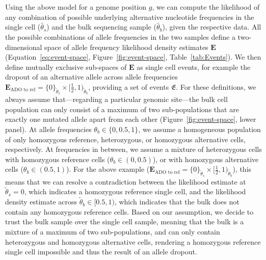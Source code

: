 \documentclass[authoryear,preprint,11pt]{scrartcl}
\begin{document}
Using the above model for a genome position $g$, we can compute the likelihood of any combination of possible underlying alternative nucleotide frequencies in the single cell ($\tilde{\theta_s}$) and the bulk sequencing sample ($\tilde{\theta_b}$), given the respective data.
All the possible combinations of allele frequencies in the two samples define a two-dimensional space of allele frequency likelihood density estimates $\boldsymbol{E}$ (Equation~\ref{eq:event-space}, Figure~\ref{fig:event-space}, Table~\ref{tab:Events}).
We then define mutually exclusive sub-spaces of $\boldsymbol{E}$ as single cell events, for example the dropout of an alternative allele across allele frequencies $\boldsymbol{E}_{\text{ADO to ref}} = \{ 0 \}_{\tilde{\theta}_s} \times [\frac{1}{2}, 1)_{\tilde{\theta}_b}$, providing a set of events $\mathfrak{E}$.
For these definitions, we always assume that---regarding a particular genomic site---the bulk cell population can only consist of a maximum of two sub-populations that are exactly one mutated allele apart from each other (Figure~\ref{fig:event-space}, lower panel).
At allele frequencies $\theta_b \in \{0, 0.5, 1\}$, we assume a homogeneous population of only homozygous reference, heterozygous, or homozygous alternative cells, respectively.
At frequencies in between, we assume a mixture of heterozygous cells with homozygous reference cells ($\theta_b \in (0,0.5)$), or with homozygous alternative cells ($\theta_b \in (0.5,1)$).
For the above example ($\boldsymbol{E}_{\text{ADO to ref}} = \{ 0 \}_{\tilde{\theta}_s} \times [\frac{1}{2}, 1)_{\tilde{\theta}_b}$), this means that we can resolve a contradiction between the likelihood estimate at $\tilde{\theta}_s = 0$, which indicates a homozygous reference single cell, and the likelihood density estimate across $\tilde{\theta}_b \in [0.5,1)$, which indicates that the bulk does not contain any homozygous reference cells.
Based on our assumption, we decide to trust the bulk sample over the single cell sample, meaning that the bulk is a mixture of a maximum of two sub-populations, and can only contain heterozygous and homozygous alternative cells, rendering a homozygous reference single cell impossible and thus the result of an allele dropout.
\end{document}
